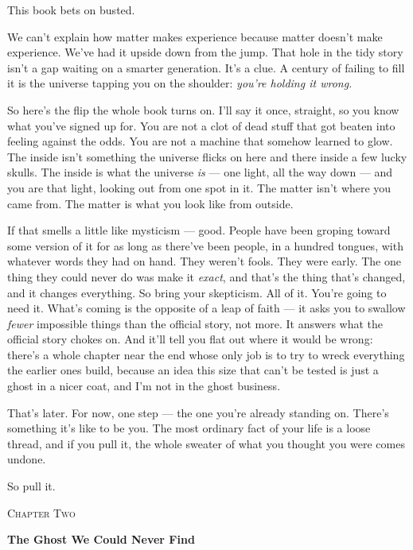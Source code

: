 \documentclass[11pt,openany]{book}
\begin{document}
This book bets on busted.

We can’t explain how matter makes experience because matter doesn’t make experience. We’ve had it upside down from the jump. That hole in the tidy story isn’t a gap waiting on a smarter generation. It’s a clue. A century of failing to fill it is the universe tapping you on the shoulder: \textit{you’re holding it wrong.}

So here’s the flip the whole book turns on. I’ll say it once, straight, so you know what you’ve signed up for. You are not a clot of dead stuff that got beaten into feeling against the odds. You are not a machine that somehow learned to glow. The inside isn’t something the universe flicks on here and there inside a few lucky skulls. The inside is what the universe \textit{is} — one light, all the way down — and you are that light, looking out from one spot in it. The matter isn’t where you came from. The matter is what you look like from outside.

If that smells a little like mysticism — good. People have been groping toward some version of it for as long as there’ve been people, in a hundred tongues, with whatever words they had on hand. They weren’t fools. They were early. The one thing they could never do was make it \textit{exact}, and that’s the thing that’s changed, and it changes everything. So bring your skepticism. All of it. You’re going to need it. What’s coming is the opposite of a leap of faith — it asks you to swallow \textit{fewer} impossible things than the official story, not more. It answers what the official story chokes on. And it’ll tell you flat out where it would be wrong: there’s a whole chapter near the end whose only job is to try to wreck everything the earlier ones build, because an idea this size that can’t be tested is just a ghost in a nicer coat, and I’m not in the ghost business.

That’s later. For now, one step — the one you’re already standing on. There’s something it’s like to be you. The most ordinary fact of your life is a loose thread, and if you pull it, the whole sweater of what you thought you were comes undone.

So pull it.


\clearpage
\vspace*{0.6in}
{\centering\scshape\large Chapter Two\par}
\vspace{0.8em}
{\centering\bfseries\fontsize{20}{24}\selectfont The Ghost We Could Never Find\par}
\vspace{1.6em}
\end{document}
